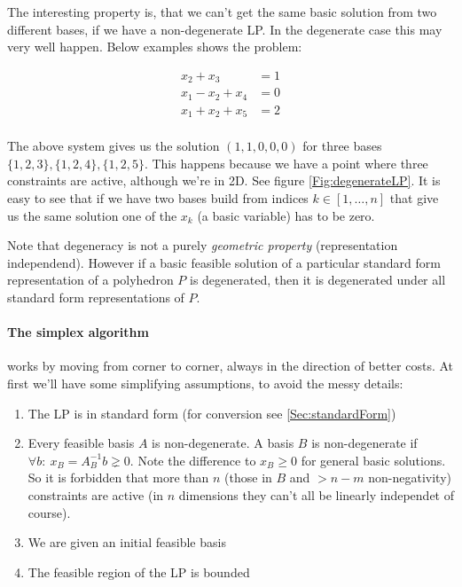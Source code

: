 The interesting property is, that we can't get the same basic solution from two different bases, if we have a non-degenerate LP. In the degenerate case this may very well happen. Below examples shows the problem:

\begin{align*}
x_2 + x_3 &= 1\\
x_1 - x_2 +x_4 &=0\\
x_1 + x_2 +x_5 &= 2\\
\end{align*}


The above system gives us the solution $(1,1,0,0,0)$ for three bases $\{1,2,3\},\{1,2,4\},\{1,2,5\}$. This happens because we have a point where three constraints are active, although we're in 2D. See figure \ref{Fig:degenerateLP}. It is easy to see that if we have two bases build from indices $k\in [1,\ldots,n]$ that give us the same solution one of the $x_k$ (a basic variable) has to be zero. %

Note that degeneracy is not a purely \emph{geometric property} (representation independend). However if a basic feasible solution of a particular standard form representation of a polyhedron $P$ is degenerated, then it is degenerated under all standard form representations of $P$.


\paragraph*{The simplex algorithm} works by moving from corner to corner, always in the direction of better costs. At first we'll have some simplifying assumptions, to avoid the messy details:

\begin{enumerate}
\item The LP is in standard form (for conversion see \ref{Sec:standardForm})
\item Every feasible basis $A$ is non-degenerate. A basis $B$ is non-degenerate if $\forall b:\ x_B=A^{-1}_Bb \gneq 0$. Note the difference to $x_B\geq 0$ for general basic solutions. So it is forbidden that more than $n$ (those in $B$ and $>n-m$ non-negativity) constraints are active (in $n$ dimensions they can't all be linearly independet of course). 
\item We are given an initial feasible basis
\item The feasible region of the LP is bounded
\end{enumerate}

